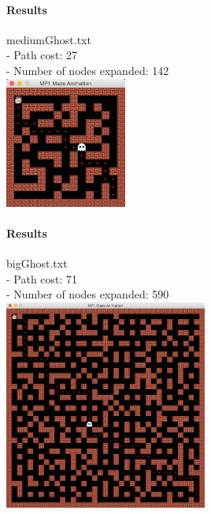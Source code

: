 \begin{multicols*}{2}
\paragraph{Results}
mediumGhost.txt\\
- Path cost: 27\\
- Number of nodes expanded: 142\\
\includegraphics[width=0.3\textwidth]{graphics/mediumGhosts.png}
\columnbreak

\paragraph{Results}
bigGhost.txt\\
- Path cost: 71\\
- Number of nodes expanded: 590\\
\includegraphics[width=0.5\textwidth]{graphics/bigGhosts.png}


\end{multicols*}
